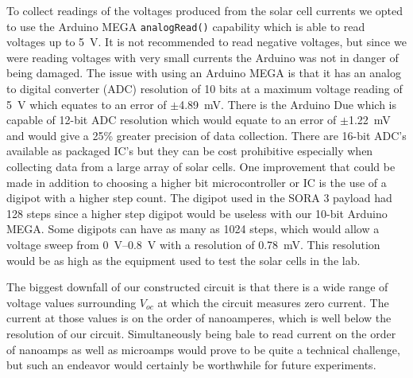 To collect readings of the voltages produced from the solar cell currents we opted to use the Arduino MEGA \texttt{analogRead()} capability which is able to read voltages up to \SI{5}{\volt}.
It is not recommended to read negative voltages, but since we were reading voltages with very small currents the Arduino was not in danger of being damaged.
The issue with using an Arduino MEGA is that it has an analog to digital converter (ADC) resolution of 10 bits at a maximum voltage reading of \SI{5}{\volt} which equates to an error of $\pm$\SI{4.89}{\milli\volt}.
There is the Arduino Due which is capable of 12-bit ADC resolution which would equate to an error of $\pm$\SI{1.22}{\milli\volt} and would give a 25\% greater precision of data collection.
There are 16-bit ADC's available as packaged IC's but they can be cost prohibitive especially when collecting data from a large array of solar cells.
One improvement that could be made in addition to choosing a higher bit microcontroller or IC is the use of a digipot with a higher step count.
The digipot used in the SORA 3 payload had 128 steps since a higher step digipot would be useless with our 10-bit Arduino MEGA.
Some digipots can have as many as 1024 steps, which would allow a voltage sweep from \SIrange{0}{0.8}{\volt} with a resolution of \SI{0.78}{\milli\volt}.
This resolution would be as high as the equipment used to test the solar cells in the lab.

The biggest downfall of our constructed circuit is that there is a wide range of voltage values surrounding $V_{oc}$ at which the circuit measures zero current.
The current at those values is on the order of nanoamperes, which is well below the resolution of our circuit.
Simultaneously being bale to read current on the order of nanoamps as well as microamps would prove to be quite a technical challenge, but such an endeavor would certainly be worthwhile for future experiments.
